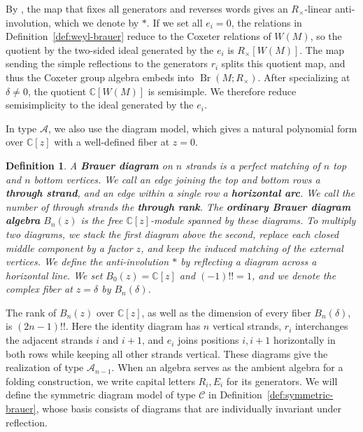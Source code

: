 \documentclass[11pt,a4paper]{amsart}
\newcommand{\Br}{\operatorname{Br}}\newcommand{\Irr}{\operatorname{Irr}}
\theoremstyle{uprightdefinition}
\newtheorem{definition}[theorem]{Definition}
\theoremstyle{remark}\newtheorem{remark}[theorem]{Remark}
\begin{document}
By \cite[Proposition~5.3]{LiuG22015}, the map that fixes all generators and reverses words gives an
$R_\times$-linear anti-involution, which we denote by $*$. If we set all $e_i=0$, the relations in Definition~\ref{def:weyl-brauer} reduce to
the Coxeter relations of $W(M)$, so the quotient by the two-sided ideal generated by the $e_i$
is $R_\times[W(M)]$. The map sending the simple reflections to the generators
$r_i$ splits this quotient map, and thus the Coxeter group algebra
embeds into $\Br(M;R_\times)$. After specializing at $\delta\ne0$, the quotient $\mathbb C[W(M)]$
is semisimple. We therefore reduce semisimplicity to the ideal generated
by the $e_i$.

In type $\mathscr{A}$, we also use the diagram model, which gives a natural
polynomial form over $\mathbb C[z]$ with a well-defined fiber at $z=0$.

\begin{definition}\label{def:ordinary-brauer}
\cite[Section~4, equation~(4.2)]{GL1996}
A \textbf{Brauer diagram} on $n$ strands is a perfect matching of
$n$ top and $n$ bottom vertices. We call an edge joining the top and bottom rows a
\textbf{through strand}, and an edge within a single row a \textbf{horizontal arc}.
We call the number of through strands the \textbf{through rank}. The \textbf{ordinary Brauer diagram
algebra} $B_n(z)$ is the free $\mathbb C[z]$-module spanned by these diagrams.
To multiply two diagrams, we stack the first diagram above the second, replace each
closed middle component by a factor $z$, and keep the induced
matching of the external vertices. We define the anti-involution $*$ by reflecting a diagram across a horizontal line.
We set $B_0(z)=\mathbb C[z]$ and $(-1)!!=1$, and we denote the complex fiber at $z=\delta$
by $B_n(\delta)$.
\end{definition}

The rank of $B_n(z)$ over $\mathbb C[z]$, as well as the dimension of every fiber $B_n(\delta)$, is $(2n-1)!!$.
Here the identity diagram has $n$ vertical strands, $r_i$ interchanges the
adjacent strands $i$ and $i+1$, and $e_i$ joins positions $i,i+1$ horizontally in
both rows while keeping all other strands vertical. These diagrams give
the realization of type $\mathscr{A}_{n-1}$.
When an algebra serves as the ambient algebra for a folding construction, we write capital letters $R_i,E_i$ for its generators.
We will define the symmetric diagram model of type $\mathscr{C}$ in
Definition~\ref{def:symmetric-brauer}, whose basis consists of diagrams that are individually
invariant under reflection.
\end{document}
